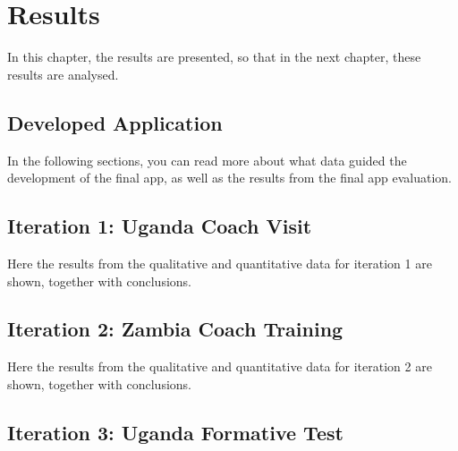\chapter{Results}\label{cha:Research}
%


In this chapter, the results are presented, so that in the next chapter, these results are analysed. 

%

\section{Developed Application}

  

In the following sections, you can read more about what data guided the development of the final app, as well as the results from the final app evaluation.

\section{Iteration 1: Uganda Coach Visit}

Here the results from the qualitative and quantitative data for iteration 1 are shown, together with conclusions.





\section{Iteration 2: Zambia Coach Training}

Here the results from the qualitative and quantitative data for iteration 2 are shown, together with conclusions.





\section{Iteration 3: Uganda Formative Test}

